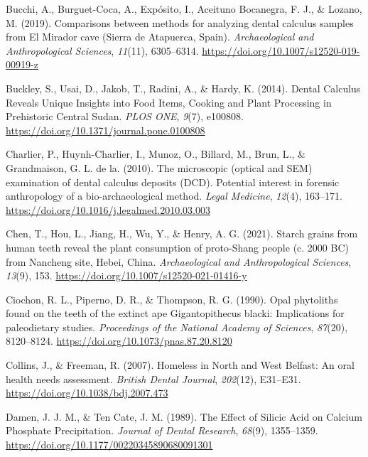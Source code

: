 \documentclass[
  b5paper,
]{book}
\newlength{\cslhangindent}
\newenvironment{CSLReferences}[2] %
 {\begin{list}{}{%
  \setlength{\itemindent}{0pt}
  \setlength{\leftmargin}{0pt}
  \setlength{\parsep}{0pt}
  \ifodd #1
   \setlength{\leftmargin}{\cslhangindent}
   \setlength{\itemindent}{-1\cslhangindent}
  \fi
  \setlength{\itemsep}{#2\baselineskip}}}
 {\end{list}}
\begin{document}
\begin{CSLReferences}{1}{0}
Bucchi, A., Burguet-Coca, A., Expósito, I., Aceituno Bocanegra, F. J.,
\& Lozano, M. (2019). Comparisons between methods for analyzing dental
calculus samples from {El Mirador} cave ({Sierra} de {Atapuerca},
{Spain}). \emph{Archaeological and Anthropological Sciences},
\emph{11}(11), 6305--6314.
\url{https://doi.org/10.1007/s12520-019-00919-z}

Buckley, S., Usai, D., Jakob, T., Radini, A., \& Hardy, K. (2014).
Dental {Calculus Reveals Unique Insights} into {Food Items}, {Cooking}
and {Plant Processing} in {Prehistoric Central Sudan}. \emph{PLOS ONE},
\emph{9}(7), e100808. \url{https://doi.org/10.1371/journal.pone.0100808}

Charlier, P., Huynh-Charlier, I., Munoz, O., Billard, M., Brun, L., \&
Grandmaison, G. L. de la. (2010). The microscopic (optical and {SEM})
examination of dental calculus deposits ({DCD}). {Potential} interest in
forensic anthropology of a bio-archaeological method. \emph{Legal
Medicine}, \emph{12}(4), 163--171.
\url{https://doi.org/10.1016/j.legalmed.2010.03.003}

Chen, T., Hou, L., Jiang, H., Wu, Y., \& Henry, A. G. (2021). Starch
grains from human teeth reveal the plant consumption of proto-{Shang}
people (c. 2000 {BC}) from {Nancheng} site, {Hebei},
{China}. \emph{Archaeological and Anthropological Sciences},
\emph{13}(9), 153. \url{https://doi.org/10.1007/s12520-021-01416-y}

Ciochon, R. L., Piperno, D. R., \& Thompson, R. G. (1990). Opal
phytoliths found on the teeth of the extinct ape {Gigantopithecus}
blacki: Implications for paleodietary studies. \emph{Proceedings of the
National Academy of Sciences}, \emph{87}(20), 8120--8124.
\url{https://doi.org/10.1073/pnas.87.20.8120}

Collins, J., \& Freeman, R. (2007). Homeless in {North} and {West
Belfast}: An oral health needs assessment. \emph{British Dental
Journal}, \emph{202}(12), E31--E31.
\url{https://doi.org/10.1038/bdj.2007.473}

Damen, J. J. M., \& Ten Cate, J. M. (1989). The {Effect} of {Silicic
Acid} on {Calcium Phosphate Precipitation}. \emph{Journal of Dental
Research}, \emph{68}(9), 1355--1359.
\url{https://doi.org/10.1177/00220345890680091301}


\end{CSLReferences}
\end{document}
